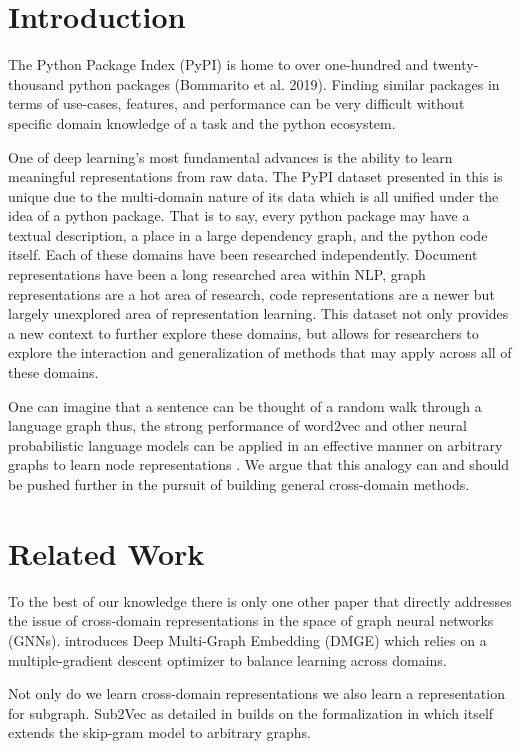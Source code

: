 \documentclass{article}
\begin{document}
\section{Introduction}
The Python Package Index (PyPI) is home to over one-hundred and twenty-thousand python packages (Bommarito et al. 2019). Finding similar packages in terms of use-cases, features, and performance can be very difficult without specific domain knowledge of a task and the python ecosystem. 

One of deep learning's most fundamental advances is the ability to learn meaningful representations from raw data. The PyPI dataset presented in this is unique due to the multi-domain nature of its data which is all unified under the idea of a python package. That is to say, every python package may have a textual description, a place in a large dependency graph, and the python code itself. Each of these domains have been researched independently. Document representations have been a long researched area within NLP, graph representations are a hot area of research, code representations are a newer but largely unexplored area of representation learning. This dataset not only provides a new context to further explore these domains, but allows for researchers to explore the interaction and generalization of methods that may apply across all of these domains. 

One can imagine that a sentence can be thought of a random walk through a language graph thus, the strong performance of word2vec \cite{word2vec} and other neural probabilistic language models \cite{bengio2003neural} can be applied in an effective manner on arbitrary graphs to learn node representations \cite{deepwalk}. We argue that this analogy can and should be pushed further in the pursuit of building general cross-domain methods.

\section{Related Work}

To the best of our knowledge there is only one other paper that directly addresses the issue of cross-domain representations in the space of graph neural networks (GNNs). \cite{ouyang2019learning} introduces Deep Multi-Graph Embedding (DMGE) which relies on a multiple-gradient descent optimizer to balance learning across domains. 

Not only do we learn cross-domain representations we also learn a representation for subgraph. Sub2Vec as detailed in \cite{adhikari2017distributed} builds on the formalization in \cite{deepwalk} which itself extends the skip-gram model \cite{word2vec} to arbitrary graphs.
\end{document}
